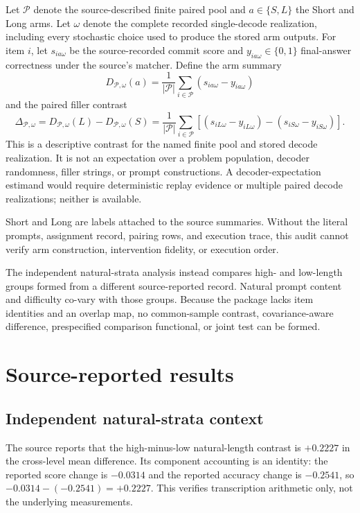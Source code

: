 \documentclass{article}
\newcommand{\crossdiff}{D}
\begin{document}
Let $\mathcal P$ denote the source-described finite paired pool and
$a\in\{S,L\}$ the Short and Long arms.  Let $\omega$ denote the complete recorded
single-decode realization, including every stochastic choice used to produce the stored
arm outputs.  For item $i$, let $s_{ia\omega}$ be the source-recorded commit score and
$y_{ia\omega}\in\{0,1\}$ final-answer correctness under the source's matcher.  Define
the arm summary
\[
 \crossdiff_{\mathcal P,\omega}(a)
 = \frac{1}{|\mathcal P|}\sum_{i\in\mathcal P}
   \left(s_{ia\omega}-y_{ia\omega}\right)
\]
and the paired filler contrast
\[
 \Delta_{\mathcal P,\omega}
 = \crossdiff_{\mathcal P,\omega}(L)-\crossdiff_{\mathcal P,\omega}(S)
 = \frac{1}{|\mathcal P|}\sum_{i\in\mathcal P}
 \left[(s_{iL\omega}-y_{iL\omega})-(s_{iS\omega}-y_{iS\omega})\right].
 \label{eq:recorded-estimand}
\]
This is a descriptive contrast for the named finite pool and stored decode realization.
It is not an expectation over a problem population, decoder randomness, filler strings,
or prompt constructions.  A decoder-expectation estimand would require deterministic
replay evidence or multiple paired decode realizations; neither is available.

Short and Long are labels attached to the source summaries.  Without the literal
prompts, assignment record, pairing rows, and execution trace, this audit cannot verify
arm construction, intervention fidelity, or execution order.

The independent natural-strata analysis instead compares high- and low-length groups
formed from a different source-reported record.  Natural prompt content and difficulty
co-vary with those groups.  Because the package lacks item identities and an overlap
map, no common-sample contrast, covariance-aware difference, prespecified comparison
functional, or joint test can be formed.

\section{Source-reported results}
\label{sec:results}

\subsection{Independent natural-strata context}

The source reports that the high-minus-low natural-length contrast is $+0.2227$ in the
cross-level mean difference.  Its component accounting is an identity: the reported
score change is $-0.0314$ and the reported accuracy change is $-0.2541$, so
$-0.0314-(-0.2541)=+0.2227$.  This verifies transcription arithmetic only, not the
underlying measurements.
\end{document}
